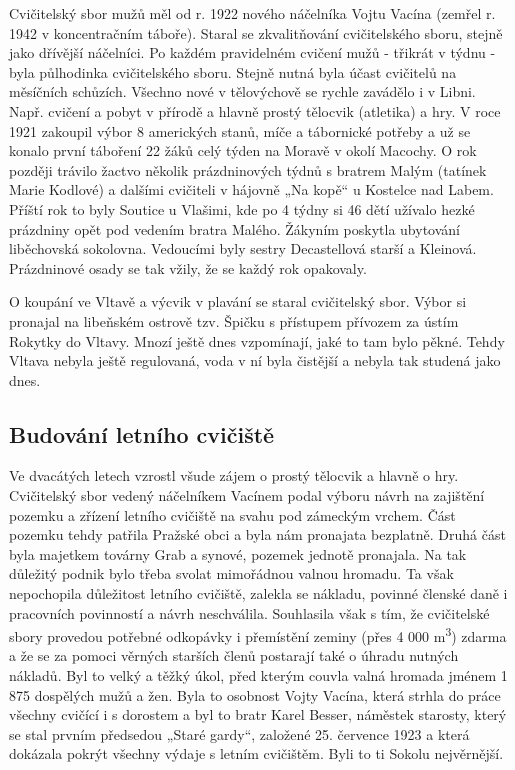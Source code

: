 Cvičitelský sbor mužů měl od r. 1922 nového náčelníka Vojtu Vacína
(zemřel r. 1942 v koncentračním táboře). Staral se zkvalitňování
cvičitelského sboru, stejně jako dřívější náčelníci. Po každém
pravidelném cvičení mužů - třikrát v týdnu - byla půlhodinka
cvičitelského sboru. Stejně nutná byla účast cvičitelů na měsíčních
schůzích. Všechno nové v tělovýchově se rychle zavádělo i v Libni. Např.
cvičení a pobyt v přírodě a hlavně prostý tělocvik (atletika) a hry. V
roce 1921 zakoupil výbor 8 amerických stanů, míče a tábornické potřeby a
už se konalo první táboření 22 žáků celý týden na Moravě v okolí
Macochy. O rok později trávilo žactvo několik prázdninových týdnů s
bratrem Malým (tatínek Marie Kodlové) a dalšími cvičiteli v hájovně „Na
kopě`` u Kostelce nad Labem. Příští rok to byly Soutice u Vlašimi, kde
po 4 týdny si 46 dětí užívalo hezké prázdniny opět pod vedením bratra
Malého. Žákyním poskytla ubytování liběchovská sokolovna. Vedoucími byly
sestry Decastellová starší a Kleinová. Prázdninové osady se tak vžily,
že se každý rok opakovaly.

O koupání ve Vltavě a výcvik v plavání se staral cvičitelský sbor. Výbor
si pronajal na libeňském ostrově tzv. Špičku s přístupem přívozem za
ústím Rokytky do Vltavy. Mnozí ještě dnes vzpomínají, jaké to tam bylo
pěkné. Tehdy Vltava nebyla ještě regulovaná, voda v ní byla čistější a
nebyla tak studená jako dnes.

\subsection{Budování letního
cvičiště}\label{budovuxe1nuxed-letnuxedho-cviux10diux161tux11b}

Ve dvacátých letech vzrostl všude zájem o prostý tělocvik a hlavně o
hry. Cvičitelský sbor vedený náčelníkem Vacínem podal výboru návrh na
zajištění pozemku a zřízení letního cvičiště na svahu pod zámeckým
vrchem. Část pozemku tehdy patřila Pražské obci a byla nám pronajata
bezplatně. Druhá část byla majetkem továrny Grab a synové, pozemek
jednotě pronajala. Na tak důležitý podnik bylo třeba svolat mimořádnou
valnou hromadu. Ta však nepochopila důležitost letního cvičiště, zalekla
se nákladu, povinné členské daně i pracovních povinností a návrh
neschválila. Souhlasila však s tím, že cvičitelské sbory provedou
potřebné odkopávky i přemístění zeminy (přes 4 000 m\textsuperscript{3})
zdarma a že se za pomoci věrných starších členů postarají také o úhradu
nutných nákladů. Byl to velký a těžký úkol, před kterým couvla valná
hromada jménem 1 875 dospělých mužů a žen. Byla to osobnost Vojty
Vacína, která strhla do práce všechny cvičící i s dorostem a byl to
bratr Karel Besser, náměstek starosty, který se stal prvním předsedou
„Staré gardy``, založené 25. července 1923 a která dokázala pokrýt
všechny výdaje s letním cvičištěm. Byli to ti Sokolu nejvěrnější.

